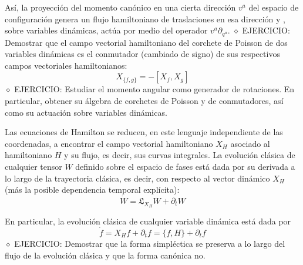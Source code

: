 Así, la proyección del momento canónico en una cierta dirección $v^{a}$ del espacio de configuración genera un flujo hamiltoniano de traslaciones en esa dirección y , sobre variables dinámicas, actúa por medio del operador $v^{a} \partial_{q^{a}}$.
$\diamond$ EJERCICIO: Demostrar que el campo vectorial hamiltoniano del corchete de Poisson de dos variables dinámicas es el conmutador (cambiado de signo) de sus respectivos campos vectoriales hamiltonianos:
$$
X_{\{f, g\}}=-\left[X_{f}, X_{g}\right]
$$
$\diamond$ EJERCICIO: Estudiar el momento angular como generador de rotaciones. En particular, obtener su álgebra de corchetes de Poisson y de conmutadores, así como su actuación sobre variables dinámicas.

Las ecuaciones de Hamilton se reducen, en este lenguaje independiente de las coordenadas, a encontrar el campo vectorial hamiltoniano $X_{H}$ asociado al hamiltoniano $H$ y su flujo, es decir, sus curvas integrales. La evolución clásica de cualquier tensor $W$ definido sobre el espacio de fases está dada por su derivada a lo largo de la trayectoria clásica, es decir, con respecto al vector dinámico $X_{H}$ (más la posible dependencia temporal explícita):
$$
\dot{W}=\mathfrak{L}_{X_{H}} W+\partial_{t} W
$$

En particular, la evolución clásica de cualquier variable dinámica está dada por
$$
\dot{f}=X_{H} f+\partial_{t} f=\{f, H\}+\partial_{t} f
$$
$\diamond$ EJERCICIO: Demostrar que la forma simpléctica se preserva a lo largo del flujo de la evolución clásica y que la forma canónica no.